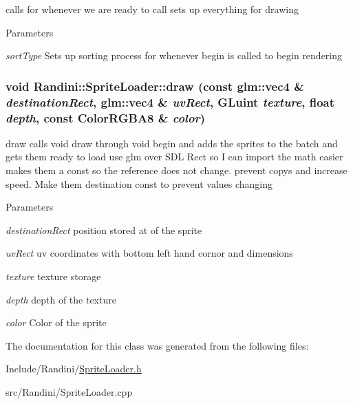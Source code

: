 calls for whenever we are ready to call sets up everything for drawing 
\begin{DoxyParams}{Parameters}
\item[{\em sortType}]Sets up sorting process for whenever begin is called to begin rendering \end{DoxyParams}
\hypertarget{classRandini_1_1SpriteLoader_acfb6c713ca114db19e1b724ed08fc645}{
\subsubsection[{draw}]{\setlength{\rightskip}{0pt plus 5cm}void Randini::SpriteLoader::draw (const glm::vec4 \& {\em destinationRect}, \/  glm::vec4 \& {\em uvRect}, \/  GLuint {\em texture}, \/  float {\em depth}, \/  const {\bf ColorRGBA8} \& {\em color})}}
\label{classRandini_1_1SpriteLoader_acfb6c713ca114db19e1b724ed08fc645}


draw calls void draw through void begin and adds the sprites to the batch and gets them ready to load use glm over SDL Rect so I can import the math easier makes them a const so the reference does not change. prevent copys and increase speed. Make them destination const to prevent values changing 
\begin{DoxyParams}{Parameters}
\item[{\em destinationRect}]position stored at of the sprite \item[{\em uvRect}]uv coordinates with bottom left hand cornor and dimensions \item[{\em texture}]texture storage \item[{\em depth}]depth of the texture \item[{\em color}]Color of the sprite \end{DoxyParams}


The documentation for this class was generated from the following files:\begin{DoxyCompactItemize}
\item 
Include/Randini/\hyperlink{SpriteLoader_8h}{SpriteLoader.h}\item 
src/Randini/SpriteLoader.cpp\end{DoxyCompactItemize}
